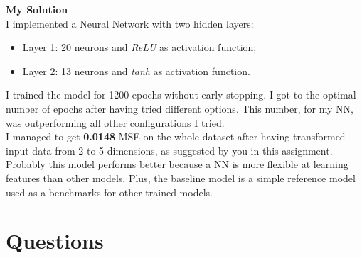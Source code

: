 \documentclass[11pt]{scrartcl}
\begin{document}
\textbf{My Solution}  \\
I implemented a Neural Network with two hidden layers:
\begin{itemize}
    \item Layer 1: 20 neurons and \textit{ReLU} as activation function;
    \item Layer 2: 13 neurons and \textit{tanh} as activation function.
\end{itemize}
I trained the model for 1200 epochs without early stopping. I got to the optimal number of epochs after having tried different options. This number, for my NN, was outperforming all other configurations I tried. \\
I managed to get \textbf{0.0148} MSE on the whole dataset after having transformed input data from 2 to 5 dimensions, as suggested by you in this assignment.\\
Probably this model performs better because a NN is more flexible at learning features than other models. Plus, the baseline model is a simple reference model used as a  benchmarks for other trained models.
\section*{Questions}
\end{document}
